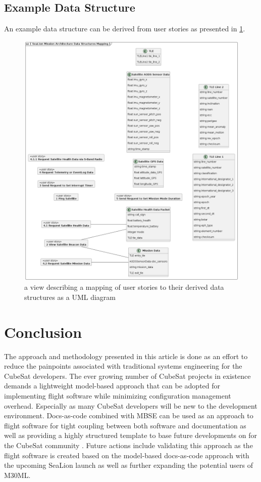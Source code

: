 \documentclass[conf]{new-aiaa}
\begin{document}
\subsection{Example Data Structure}

An example data structure can be derived from user stories as presented in \ref{data-structures-mapping}.

\begin{figure}[hbt!]
    \centering
    \includegraphics[width=.5\textwidth]{data-structures-mapping}
    \caption{a view describing a mapping of user stories to their derived data structures as a UML diagram}
    \label{data-structures-mapping}
\end{figure}


\section{Conclusion}

The approach and methodology presented in this article is done as an effort to reduce the painpoints associated with traditional systems engineering for the CubeSat developers. The ever growing number of CubeSat projects in existence demands a lightweight model-based approach that can be adopted for implementing flight software while minimizing configuration management overhead. Especially as many CubeSat developers will be new to the development environment. Docs-as-code combined with MBSE can be used as an approach to flight software for tight coupling between both software and documentation as well as providing a highly structured template to base future developments on for the CubeSat community \cite{sealion_mission_architecture}. Future actions include validating this approach as the flight software is created based on the model-based docs-as-code approach with the upcoming SeaLion launch as well as further expanding the potential users of M30ML.




\end{document}

